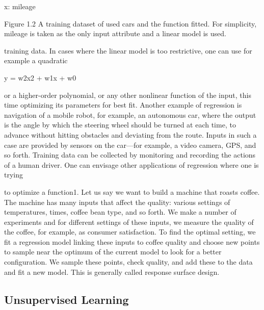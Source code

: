 x: mileage

Figure 1.2 A training dataset of used cars and the function fitted. For simplicity, mileage is taken as the only input attribute and a linear model is used.

training data. In cases where the linear model is too restrictive, one can use for example a quadratic

y = w2x2 + w1x + w0

or a higher-order polynomial, or any other nonlinear function of the input, this time optimizing its parameters for best fit. Another example of regression is navigation of a mobile robot, for example, an autonomous car, where the output is the angle by which the steering wheel should be turned at each time, to advance without hitting obstacles and deviating from the route. Inputs in such a case are provided by sensors on the car---for example, a video camera, GPS, and so forth. Training data can be collected by monitoring and recording the actions of a human driver. One can envisage other applications of regression where one is trying

to optimize a function1. Let us say we want to build a machine that roasts coffee. The machine has many inputs that affect the quality: various settings of temperatures, times, coffee bean type, and so forth. We make a number of experiments and for different settings of these inputs, we measure the quality of the coffee, for example, as consumer satisfaction. To find the optimal setting, we fit a regression model linking these inputs to coffee quality and choose new points to sample near the optimum of the current model to look for a better configuration. We sample these points, check quality, and add these to the data and fit a new model. This is generally called response surface design.

\subsection{Unsupervised Learning}

